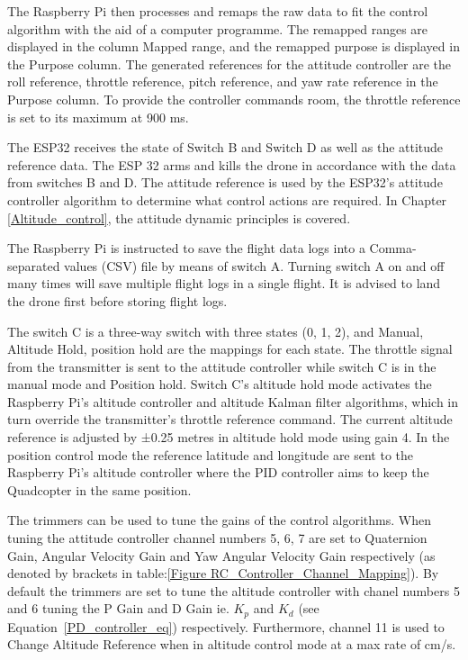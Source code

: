 \documentclass{report}
\begin{document}
The Raspberry Pi then processes and remaps the raw data to fit the control
algorithm with the aid of a computer programme. The remapped ranges are
displayed in the column Mapped range, and the remapped purpose is displayed in
the Purpose column. The generated references for the attitude controller are the
roll reference, throttle reference, pitch reference, and yaw rate reference in
the Purpose column. To provide the controller commands room, the throttle
reference is set to its maximum at 900 ms.

The ESP32 receives the state of Switch B and Switch D as well as the attitude
reference data. The ESP 32  arms and kills the drone in accordance with the data
from switches B and D. The attitude reference is used by the ESP32's attitude
controller algorithm to determine what control actions are required. In Chapter
\ref{Altitude_control}, the attitude dynamic principles is covered. 

The Raspberry Pi is instructed to save the flight data logs into a
Comma-separated values (CSV) file by means of switch A. Turning switch A on and
off many times will save multiple flight logs in a single flight. It is advised
to land the drone first before storing flight logs.

The switch C is a three-way switch with three states ({0, 1, 2}), and {Manual,
Altitude Hold, position hold} are the mappings for each state. The throttle
signal from the transmitter is sent to the attitude controller while switch C is
in the manual mode and Position hold. Switch C's altitude hold mode activates
the Raspberry Pi's altitude controller and altitude Kalman filter algorithms,
which in turn override the transmitter's throttle reference command. The current
altitude reference is adjusted by ±0.25 metres in altitude hold mode using gain
4. In the position control mode the reference latitude and longitude are
sent to the Raspberry Pi's altitude controller where the PID controller aims to
keep the Quadcopter in the same position.

The trimmers can be used to tune the gains of the control algorithms. When
tuning the attitude controller channel numbers 5, 6, 7 are set to Quaternion
Gain, Angular Velocity Gain and Yaw Angular Velocity Gain respectively (as
denoted by brackets in table:\ref{Figure RC_Controller_Channel_Mapping}). By
default the trimmers are set to tune the altitude controller with chanel numbers
5 and 6 tuning the P Gain and D Gain ie. $K_{p}$ and ${K}_{d}$ (see
Equation~\ref{PD_controller_eq}) respectively. Furthermore, channel 11 is used
to Change Altitude Reference when in altitude control mode at a max rate of
\unit[4]{cm/s}. 
\end{document}
